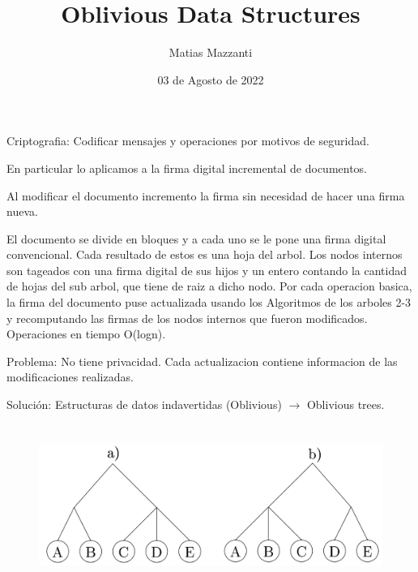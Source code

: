 \documentclass[10pt,handout]{beamer}
\title[Algoritmos y estructuras de datos 2]{Oblivious Data Structures}
\author[Matias Mazzanti]{Matias Mazzanti}
\institute{DC-UBA}
\date{03 de Agosto de 2022}
\begin{document}
\begin{frame}

\maketitle

\end{frame}

\section{}
\begin{frame}
\frametitle{}
Criptografia: Codificar mensajes y operaciones por motivos de seguridad.

En particular lo aplicamos a la firma digital incremental de documentos.

Al modificar el documento incremento la firma sin necesidad de hacer una firma nueva.


El documento se divide en bloques y a cada uno se le pone una firma digital convencional.
Cada resultado de estos es una hoja del arbol.
Los nodos internos son tageados con una firma digital de sus hijos y un entero contando
la cantidad de hojas del sub arbol, que tiene de raiz a dicho nodo.
Por cada operacion basica, la firma del documento puse actualizada usando los Algoritmos
de los arboles 2-3 y recomputando las firmas de los nodos internos que fueron modificados.
Operaciones en tiempo O(logn).

Problema: No tiene privacidad. Cada actualizacion contiene informacion de las modificaciones realizadas.

Solución: Estructuras de datos indavertidas (Oblivious) $\rightarrow$ Oblivious trees.

\end{frame}
\section{}
\begin{frame}
\frametitle{}
\begin{figure}[h!]
    \centering
    \includegraphics[scale=0.25]{2-3tree.jpg}
\end{figure}


\end{frame}
\end{document}
